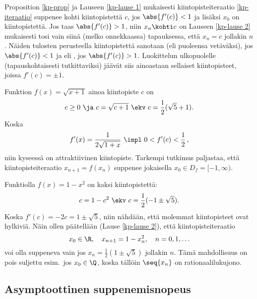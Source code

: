 Proposition \ref{kp-prop} ja Lauseen \ref{kp-lause 1} mukaisesti kiintopisteiteraatio 
\eqref{kp-iteraatio} suppenee kohti kiintopistettä $c$, jos $\abs{f'(c)}<1$ ja lisäksi $x_0$ on
  kiintopistettä. Jos taas $\abs{f'(c)}>1$, niin $x_n \kohti c$ on
Lauseen \ref{kp-lause 2} mukaisesti tosi vain siinä (melko onnekkaassa) tapauksessa, että 
%
$x_n=c$ jollakin $n$. Näiden tulosten perusteella kiintopistettä sanotaan 
(eli puoleensa vetäväksi), jos $\abs{f'(c)}<1$ ja  eli ,
jos $\abs{f'(c)}>1$. Luokittelun ulkopuolelle (tapauskohtaisesti tutkittaviksi) jäävät siis 
ainoastaan sellaiset kiintopisteet, joissa $f'(c)=\pm 1$.
\begin{Exa}
Funktion $f(x)=\sqrt{x+1}$ ainoa kiintopiste $c$ on
\[
c\geq 0 \ \ja \ c=\sqrt{c+1} \ \ekv \ c=\frac{1}{2}(\sqrt{5}+1).
\]
Koska
\[
f'(x) = \frac{1}{2\sqrt{1+x}}\ \impl\ 0 < f'(c) < \frac{1}{2}\,,
\]
niin kyseessä on attraktiivinen kiintopiste. Tarkempi tutkimus paljastaa, että 
kiintopisteiteraatio $x_{n+1}=f(x_n)$ suppenee jokaisella $x_0 \in D_f = [-1,\infty)$. 
\loppu \end{Exa}
\begin{Exa} Funktiolla $f(x)=1-x^2$ on kaksi kiintopistettä:
\[
c=1-c^2 \ \ekv \ c=\frac{1}{2}(-1\pm\sqrt{5}).
\]
Koska $f'(c)=-2c=1\pm\sqrt{5}$, niin nähdään, että molemmat kiintopisteet ovat hylkiviä. Näin
ollen päätellään (Lause \ref{kp-lause 2}), että kiintopisteiteraatio
\[
x_0 \in \R, \quad x_{n+1} = 1-x_n^2, \quad n=0,1,\ldots
\]
voi olla suppeneva vain jos $x_n=\frac{1}{2}(1\pm\sqrt{5})$ jollakin $n$. Tämä mahdollisuus on
pois suljettu esim.\ jos $x_0\in\Q$, koska tällöin $\seq{x_n}$ on rationaalilukujono. \loppu
\end{Exa}

\subsection*{Asymptoottinen suppenemisnopeus}

